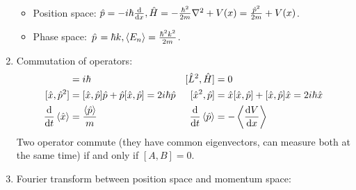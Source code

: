 \documentclass{school-22.101-notes}
\begin{document}
\begin{enumerate}
\begin{itemize}
\item Position space: $\hat{p} = -i\hbar \frac{\mathrm{d}}{\mathrm{d}x}, \hat{H} = - \frac{\hbar^2}{2m} \nabla^2 + V(x) = \frac{\hat{p}^2}{2m} + V(x)$. 
\item Phase space: $\left. \hat{p} \right. = \hbar k, \left< E_n \right> = \frac{\hbar^2 k^2}{2m}$. 
\end{itemize}

\item Commutation of operators:  
\begin{align}
[\hat{x}, \hat{p} ] &= i \hbar & [\hat{L}^2, \hat{H} ] &= 0 \\
[ \hat{x}, \hat{p}^2] &= [\hat{x}, \hat{p} ] \hat{p} + \hat{p} [\hat{x}, \hat{p} ]  = 2 i \hbar \hat{p} & [\hat{x}^2, \hat{p} ] &= \hat{x} [\hat{x}, \hat{p} ] + [\hat{x}, \hat{p} ] \hat{x} = 2 i \hbar \hat{x} \\
\ddt \expect{\hat{x}} &= \frac{\expect{\hat{p}}}{m} & \ddt \expect{\hat{p}} &= - \expect{ \dVdx }
\end{align}
Two operator commute (they have common eigenvectors, can measure both at the same time) if and only if $[A, B] = 0$. 

\item Fourier transform between position space and momentum space:



\end{enumerate}
\end{document}
